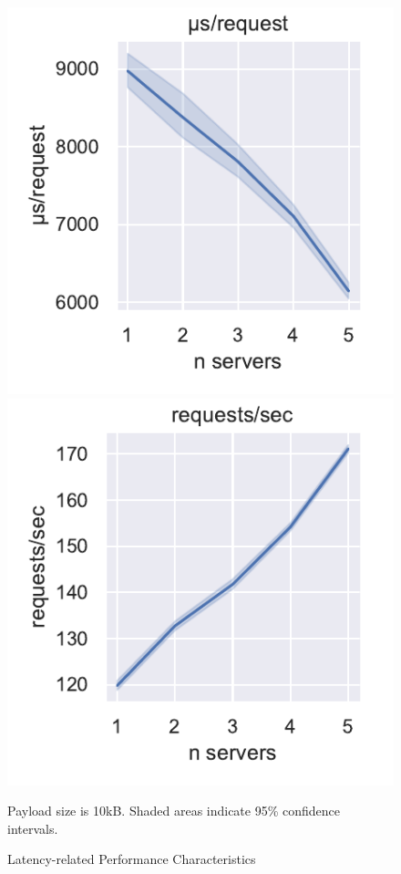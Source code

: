 \begin{figure}
	\centering
	\begin{minipage}{.45\linewidth}
		\includegraphics[width=\linewidth]{resources/servers_micros_request}
	\end{minipage}
	\hspace{0.05\linewidth}
	\begin{minipage}{.45\linewidth}
		\includegraphics[width=\linewidth]{resources/servers_requests_sec}
	\end{minipage}
	\caption{Latency-related Performance Characteristics}
	{Payload size is 10kB.
	Shaded areas indicate 95\% confidence intervals.}
	\label{fig:perf:latency}
\end{figure}

